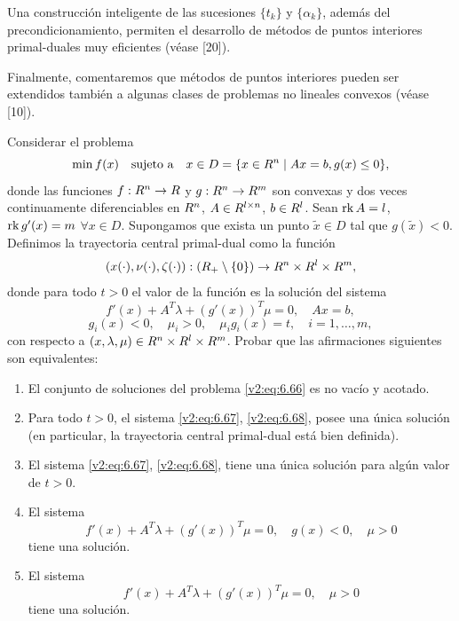Una construcción inteligente de las sucesiones $\{t_k\}$ y $\{\alpha_k\}$, además del precondicionamiento, permiten el desarrollo de métodos de puntos interiores primal-duales muy eficientes (véase [20]).

Finalmente, comentaremos que métodos de puntos interiores pueden ser extendidos también a algunas clases de problemas no lineales convexos (véase [10]).

\begin{exercise}\label{v2:ejer:6.1.22}
    Considerar el problema
    \begin{equation}
        \min f(x) \quad \text{sujeto a} \quad x \in D = \{ x \in R^n \mid Ax = b, g(x) \le 0 \},
        \label{v2:eq:6.66}
    \end{equation}
    donde las funciones $f : R^n \to R$ y $g : R^n \to R^m$ son convexas y dos veces continuamente diferenciables en $R^n$, $A \in R^{l \times n}$, $b \in R^l$. Sean $\operatorname{rk} A = l$, $\operatorname{rk} g'(x) = m$ $\forall x \in D$. Supongamos que exista un punto $\tilde{x} \in D$ tal que $g(\tilde{x}) < 0$. Definimos la trayectoria central primal-dual como la función
    \[
        (x(\cdot), \nu(\cdot), \zeta(\cdot)) : (R_+ \setminus \{0\}) \to R^n \times R^l \times R^m,
    \]
    donde para todo $t > 0$ el valor de la función es la solución del sistema
    \begin{equation}
        f'(x) + A^T \lambda + (g'(x))^T \mu = 0, \quad Ax = b,
        \label{v2:eq:6.67}
    \end{equation}
    \begin{equation}
        g_i(x) < 0, \quad \mu_i > 0, \quad \mu_i g_i(x) = t, \quad i = 1, \dots, m,
        \label{v2:eq:6.68}
    \end{equation}
    con respecto a $(x, \lambda, \mu) \in R^n \times R^l \times R^m$. Probar que las afirmaciones siguientes son equivalentes:
    \begin{enumerate}[label=(\alph*)]
        \item El conjunto de soluciones del problema \eqref{v2:eq:6.66} es no vacío y acotado.
        \item Para todo $t > 0$, el sistema \eqref{v2:eq:6.67}, \eqref{v2:eq:6.68}, posee una única solución (en particular, la trayectoria central primal-dual está bien definida).
        \item El sistema \eqref{v2:eq:6.67}, \eqref{v2:eq:6.68}, tiene una única solución para algún valor de $t > 0$.
        \item El sistema
        \[
            f'(x) + A^T \lambda + (g'(x))^T \mu = 0, \quad g(x) < 0, \quad \mu > 0
        \]
        tiene una solución.
        \item El sistema
        \[
            f'(x) + A^T \lambda + (g'(x))^T \mu = 0, \quad \mu > 0
        \]
        tiene una solución.
    \end{enumerate}
\end{exercise}